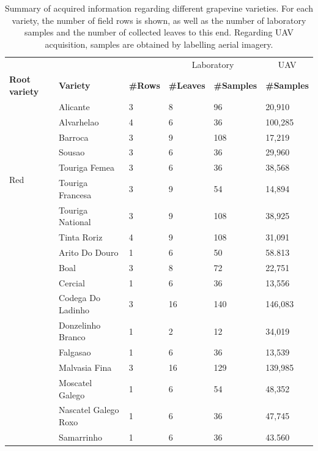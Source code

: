 \newcommand{\varietySpacing}{\hskip 0.3in}
\renewcommand{\arraystretch}{1.1}
\begin{table}[bp]
\centering
\caption{Summary of acquired information regarding different grapevine varieties. For each variety, the number of field rows is shown, as well as the number of laboratory samples and the number of collected leaves to this end. Regarding UAV acquisition, samples are obtained by labelling aerial imagery.\\ }
\label{table:grape_samples}

\begin{tabular}{|*6{l@{\varietySpacing}|}}
\cmidrule{4-6}
\multicolumn{2}{c}{} & & \multicolumn{2}{|c|}{Laboratory} & \multicolumn{1}{c|}{UAV}\\
\cmidrule{1-6}
\textbf{Root variety} & \textbf{Variety} & \textbf{\#Rows} & \textbf{\#Leaves} & \textbf{\#Samples} & \textbf{\#Samples}\\
\cmidrule{1-6}
\multirow{9}{*}{Red} & Alicante & 3 & 8 & 96 & 20,910\\
& Alvarhelao & 4 & 6 & 36 & 100,285\\
& Barroca & 3 & 9 & 108 & 17,219\\
& Sousao & 3 & 6 & 36 & 29,960\\
& Touriga Femea & 3 & 6 & 36 & 38,568\\
& Touriga Francesa & 3 & 9 & 54 & 14,894\\
& Touriga National & 3 & 9 & 108 & 38,925\\
& Tinta Roriz & 4 & 9 & 108 & 31,091\\
\cmidrule{1-6}
\multirow{8}{*}{White} & Arito Do Douro & 1 & 6 & 50 & 58.813\\
& Boal & 3 & 8 & 72 & 22,751\\
& Cercial & 1 & 6 & 36 & 13,556\\
& Codega Do Ladinho & 3 & 16 & 140 & 146,083\\
& Donzelinho Branco & 1 & 2 & 12 & 34,019\\
& Falgasao & 1 & 6 & 36 & 13,539\\
& Malvasia Fina & 3 & 16 & 129 & 139,985\\
& Moscatel Galego & 1 & 6 & 54 & 48,352\\
& Nascatel Galego Roxo & 1 & 6 & 36 & 47,745\\
& Samarrinho & 1 & 6 & 36 & 43.560\\
\bottomrule
\end{tabular}
\end{table}
\renewcommand{\arraystretch}{1}

